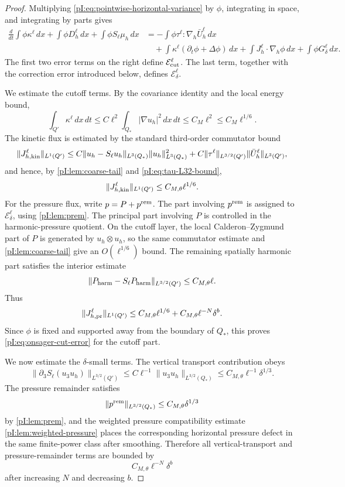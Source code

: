 \documentclass[11pt]{article}
\numberwithin{equation}{section}
\theoremstyle{plain}
\theoremstyle{definition}
\theoremstyle{remark}
\newcommand{\nabh}{\nabla_h}
\begin{document}
\begin{proof}
Multiplying \eqref{pI:eq:pointwise-horizontal-variance} by \(\phi\), integrating in space, and integrating by parts gives
\begin{equation}\label{pI:eq:localized-uncorrected-onsager}
\begin{aligned}
        \frac{d}{dt}\int \phi\kappa^\ell\,dx
        +\int \phi D_h^\ell\,dx
        +\int \phi S_\ell\mu_h\,dx
        &=-\int \phi\tau^\ell:\nabh\bar U_h^\ell\,dx \\
        &\quad+
        \int \kappa^\ell(\partial_t\phi+\Delta\phi)\,dx
        +\int J_h^\ell\cdot\nabh\phi\,dx
        +\int \phi G_\delta^\ell\,dx .
\end{aligned}
\end{equation}
The first two error terms on the right define \(\mathcal E_{\rm cut}^\ell\).  The last term, together with the correction error introduced below, defines \(\mathcal E_\delta^\ell\).

We estimate the cutoff terms.  By the covariance identity and the local energy bound,
\[
        \int_{Q'}\kappa^\ell\,dx\,dt
        \le C\ell^2\int_{Q_*}|\nabla u_h|^2\,dx\,dt
        \le C_M\ell^2
        \le C_M\ell^{1/6}.
\]
The kinetic flux is estimated by the standard third-order commutator bound
\[
        \|J_{h,{\rm kin}}^\ell\|_{L^1(Q')}
        \le
        C\|u_h-S_\ell u_h\|_{L^3(Q_*)}\|u_h\|_{L^3(Q_*)}^2
        +C\|\tau^\ell\|_{L^{3/2}(Q')}\|\bar U_h^\ell\|_{L^3(Q')},
\]
and hence, by \cref{pI:lem:coarse-tail} and \eqref{pI:eq:tau-L32-bound},
\[
        \|J_{h,{\rm kin}}^\ell\|_{L^1(Q')}
        \le C_{M,\theta}\ell^{1/6}.
\]
For the pressure flux, write \(p=P+p^{\rm rem}\).  The part involving \(p^{\rm rem}\) is assigned to \(\mathcal E_\delta^\ell\), using \cref{pI:lem:prem}.  The principal part involving \(P\) is controlled in the harmonic-pressure quotient.  On the cutoff layer, the local Calderon--Zygmund part of \(P\) is generated by \(u_h\otimes u_h\), so the same commutator estimate and \cref{pI:lem:coarse-tail} give an \(O(\ell^{1/6})\) bound.  The remaining spatially harmonic part satisfies the interior estimate
\[
        \|P_{\rm harm}-S_\ell P_{\rm harm}\|_{L^{3/2}(Q')}
        \le C_{M,\theta}\ell.
\]
Thus
\[
        \|J_{h,{\rm pr}}^\ell\|_{L^1(Q')}
        \le C_{M,\theta}\ell^{1/6}
        +C_{M,\theta}\ell^{-N}\delta^b.
\]
Since \(\phi\) is fixed and supported away from the boundary of \(Q_*\), this proves \eqref{pI:eq:onsager-cut-error} for the cutoff part.

We now estimate the \(\delta\)-small terms.  The vertical transport contribution obeys
\[
        \|\partial_3S_\ell(u_3u_h)\|_{L^{3/2}(Q')}
        \le C\ell^{-1}\|u_3u_h\|_{L^{3/2}(Q_*)}
        \le C_{M,\theta}\ell^{-1}\delta^{1/3}.
\]
The pressure remainder satisfies
\[
        \|p^{\rm rem}\|_{L^{3/2}(Q_*)}
        \le C_{M,\theta}\delta^{1/3}
\]
by \cref{pI:lem:prem}, and the weighted pressure compatibility estimate \cref{pI:lem:weighted-pressure} places the corresponding horizontal pressure defect in the same finite-power class after smoothing.  Therefore all vertical-transport and pressure-remainder terms are bounded by
\[
        C_{M,\theta}\ell^{-N}\delta^b
\]
after increasing \(N\) and decreasing \(b\).


\end{proof}
\end{document}
